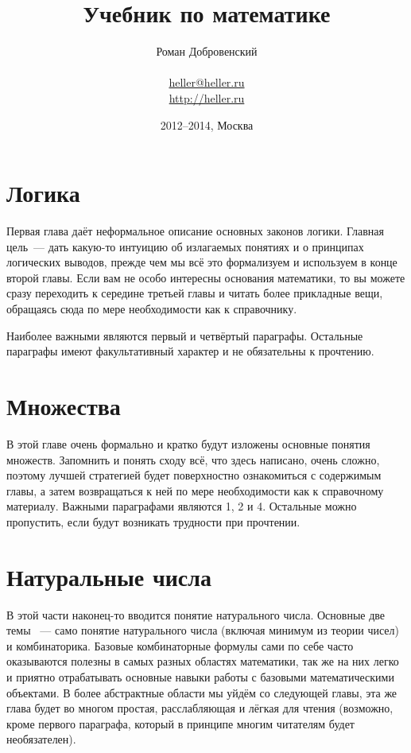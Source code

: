 \documentclass[a5paper,10pt,pagesize,DIV=classic]{scrbook}
\theoremstyle{plain}
\theoremstyle{definition}
\begin{document}
\title{Учебник по математике}
\author{Роман Добровенский\\ \\ \url{heller@heller.ru}\\ \url{http://heller.ru}}
\date{2012--2014, Москва}
\maketitle

\tableofcontents



\chapter{Логика}
Первая глава даёт неформальное описание основных законов логики. Главная цель~— дать какую-то интуицию об излагаемых понятиях и о принципах логических выводов, прежде чем мы всё это формализуем и используем в конце второй главы. Если вам не особо интересны основания математики, то вы можете сразу переходить к середине третьей главы и читать более прикладные вещи, обращаясь сюда по мере необходимости как к справочнику.

Наиболее важными являются первый и четвёртый параграфы. Остальные параграфы имеют факультативный характер и не обязательны к прочтению.







%
%




\chapter{Множества}
В этой главе очень формально и кратко будут изложены основные понятия множеств. Запомнить и понять сходу всё, что здесь написано, очень сложно, поэтому лучшей стратегией будет поверхностно ознакомиться с содержимым главы, а затем возвращаться к ней по мере необходимости как к справочному материалу. Важными параграфами являются 1, 2 и 4. Остальные можно пропустить, если будут возникать трудности при прочтении.






%



\chapter{Натуральные числа}
В этой части наконец-то вводится понятие натурального числа. Основные две темы ~— само понятие натурального числа (включая минимум из теории чисел) и комбинаторика. Базовые комбинаторные формулы сами по себе часто оказываются полезны в самых разных областях математики, так же на них легко и приятно отрабатывать основные навыки работы с базовыми математическими объектами. В более абстрактные области мы уйдём со следующей главы, эта же глава будет во многом простая, расслабляющая и лёгкая для чтения (возможно, кроме первого параграфа, который в принципе многим читателям будет необязателен).
\end{document}
